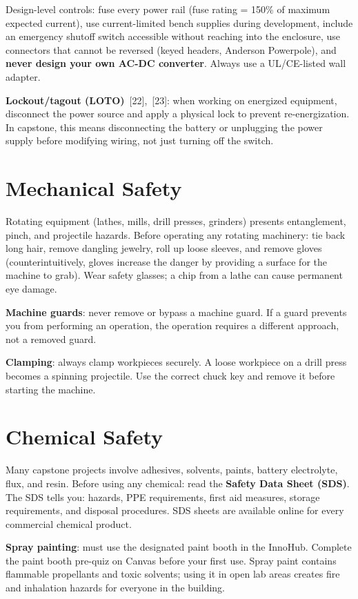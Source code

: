 Design-level controls: fuse every power rail (fuse rating = 150\% of maximum expected current), use current-limited bench supplies during development, include an emergency shutoff switch accessible without reaching into the enclosure, use connectors that cannot be reversed (keyed headers, Anderson Powerpole), and \textbf{never design your own AC-DC converter}. Always use a UL/CE-listed wall adapter.

\textbf{Lockout/tagout (LOTO)}~[22],~[23]: when working on energized equipment, disconnect the power source and apply a physical lock to prevent re-energization. In capstone, this means disconnecting the battery or unplugging the power supply before modifying wiring, not just turning off the switch.

\section{Mechanical Safety}
Rotating equipment (lathes, mills, drill presses, grinders) presents entanglement, pinch, and projectile hazards. Before operating any rotating machinery: tie back long hair, remove dangling jewelry, roll up loose sleeves, and remove gloves (counterintuitively, gloves increase the danger by providing a surface for the machine to grab). Wear safety glasses; a chip from a lathe can cause permanent eye damage.

\textbf{Machine guards}: never remove or bypass a machine guard. If a guard prevents you from performing an operation, the operation requires a different approach, not a removed guard.

\textbf{Clamping}: always clamp workpieces securely. A loose workpiece on a drill press becomes a spinning projectile. Use the correct chuck key and remove it before starting the machine.

\section{Chemical Safety}
Many capstone projects involve adhesives, solvents, paints, battery electrolyte, flux, and resin. Before using any chemical: read the \textbf{Safety Data Sheet (SDS)}. The SDS tells you: hazards, PPE requirements, first aid measures, storage requirements, and disposal procedures. SDS sheets are available online for every commercial chemical product.

\textbf{Spray painting}: must use the designated paint booth in the InnoHub. Complete the paint booth pre-quiz on Canvas before your first use. Spray paint contains flammable propellants and toxic solvents; using it in open lab areas creates fire and inhalation hazards for everyone in the building.

